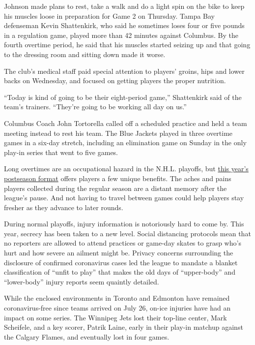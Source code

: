 Johnson made plans to rest, take a walk and do a light spin on the bike
to keep his muscles loose in preparation for Game 2 on Thursday. Tampa
Bay defenseman Kevin Shattenkirk, who said he sometimes loses four or
five pounds in a regulation game, played more than 42 minutes against
Columbus. By the fourth overtime period, he said that his muscles
started seizing up and that going to the dressing room and sitting down
made it worse.

The club's medical staff paid special attention to players' groins, hips
and lower backs on Wednesday, and focused on getting players the proper
nutrition.

``Today is kind of going to be their eight-period game,'' Shattenkirk
said of the team's trainers. ``They're going to be working all day on
us.''

Columbus Coach John Tortorella called off a scheduled practice and held
a team meeting instead to rest his team. The Blue Jackets played in
three overtime games in a six-day stretch, including an elimination game
on Sunday in the only play-in series that went to five games.

Long overtimes are an occupational hazard in the N.H.L. playoffs, but
\href{https://www.nytimes3xbfgragh.onion/2020/07/11/sports/hockey/nhl-season-restart-approved.html}{this
year's postseason format} offers players a few unique benefits. The
aches and pains players collected during the regular season are a
distant memory after the league's pause. And not having to travel
between games could help players stay fresher as they advance to later
rounds.

During normal playoffs, injury information is notoriously hard to come
by. This year, secrecy has been taken to a new level. Social distancing
protocols mean that no reporters are allowed to attend practices or
game-day skates to grasp who's hurt and how severe an ailment might be.
Privacy concerns surrounding the disclosure of confirmed coronavirus
cases led the league to mandate a blanket classification of ``unfit to
play'' that makes the old days of ``upper-body'' and ``lower-body''
injury reports seem quaintly detailed.

While the enclosed environments in Toronto and Edmonton have remained
coronavirus-free since teams arrived on July 26, on-ice injuries have
had an impact on some series. The Winnipeg Jets lost their top-line
center, Mark Scheifele, and a key scorer, Patrik Laine, early in their
play-in matchup against the Calgary Flames, and eventually lost in four
games.

